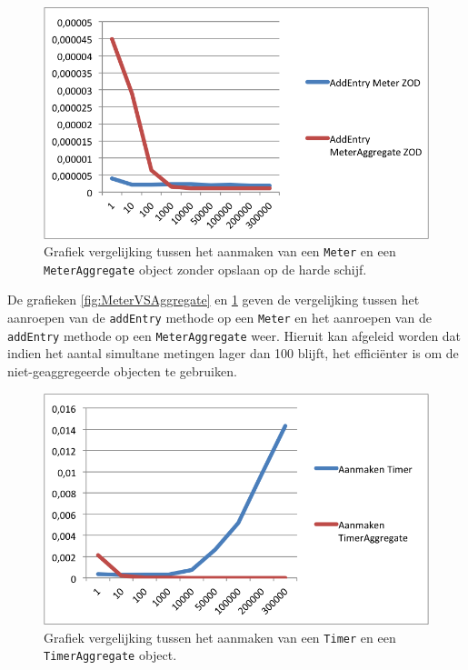 \begin{figure}[h]
  \centering
  \includegraphics[scale=1.0]{Afbeeldingen/Evaluatie/MeterVSAggregateZOD}
  \caption{Grafiek vergelijking tussen het aanmaken van een \texttt{Meter} en een \texttt{MeterAggregate} object zonder opslaan op de harde schijf.}
  \label{fig:MeterVSAggregateZOD}
\end{figure}

De grafieken \ref{fig:MeterVSAggregate} en \ref{fig:MeterVSAggregateZOD} geven de vergelijking tussen het aanroepen van de \texttt{addEntry} methode op een \texttt{Meter} en het aanroepen van de \texttt{addEntry} methode op een \texttt{MeterAggregate} weer. Hieruit kan afgeleid worden dat indien het aantal simultane metingen lager dan 100 blijft, het effici\"enter is om de niet-geaggregeerde objecten te gebruiken. \\

\begin{figure}[h]
  \centering
  \includegraphics[scale=1.0]{Afbeeldingen/Evaluatie/TimerVSAggregate}
  \caption{Grafiek vergelijking tussen het aanmaken van een \texttt{Timer} en een \texttt{TimerAggregate} object.}
  \label{fig:TimerVSAggregate}
\end{figure}

